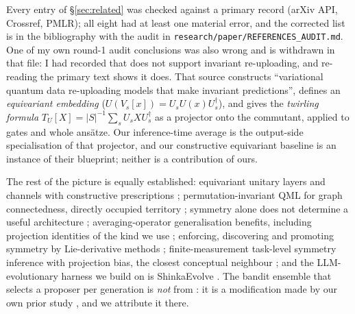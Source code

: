 \documentclass{neurips_2024}
\begin{document}
Every entry of \S\ref{sec:related} was checked against a primary record (arXiv API,
Crossref, PMLR); all eight had at least one material error, and the corrected list is in
the bibliography with the audit in \texttt{research/paper/REFERENCES\_AUDIT.md}. One of my
own round-1 audit conclusions was also wrong and is withdrawn in that file: I had recorded
that \cite{meyer2023} does not support invariant re-uploading, and re-reading the primary
text shows it does. That source constructs ``variational quantum data re-uploading models
that make invariant predictions'', defines an \emph{equivariant embedding} ($U(V_s[x]) = U_s U(x) U_s^{\dagger}$),
and gives the \emph{twirling formula} $T_U[X] = |S|^{-1}\sum_{s} U_s X U_s^{\dagger}$ as a
projector onto the commutant, applied to gates and whole ans\"atze. Our inference-time
average is the output-side specialisation of that projector, and our constructive equivariant
baseline is an instance of their blueprint; neither is a contribution of ours.

The rest of the picture is equally established: equivariant unitary layers and channels with
constructive prescriptions \cite{nguyen2024}; permutation-invariant QML for graph connectedness,
directly occupied territory \cite{mansky2025}; symmetry alone does not determine a useful
architecture \cite{baumann2026}; averaging-operator generalisation benefits, including
projection identities of the kind we use \cite{elesedy2021}; enforcing, discovering and
promoting symmetry by Lie-derivative methods \cite{otto2023}; finite-measurement task-level
symmetry inference with projection bias, the closest conceptual neighbour \cite{chen2026}; and
the LLM-evolutionary harness we build on is ShinkaEvolve \cite{lange2025}. The bandit ensemble
that selects a proposer per generation is \emph{not} from \cite{lange2025}: it is a
modification made by our own prior study \cite{ho2026prior}, and we attribute it there.
\end{document}
